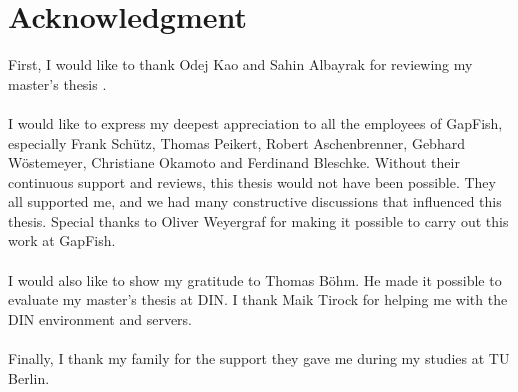 \section*{Acknowledgment}

First, I would like to thank Odej Kao and Sahin Albayrak for reviewing my master's
thesis .
\\\\
I would like to express my deepest appreciation to all the employees
of GapFish, especially Frank Schütz, Thomas Peikert, Robert
Aschenbrenner, Gebhard Wöstemeyer, Christiane Okamoto and Ferdinand
Bleschke. Without their continuous support and reviews, this thesis
would not have been possible. They all supported me, and we had many
constructive discussions that influenced this thesis. Special thanks
to Oliver Weyergraf for making it possible to carry out this work at
GapFish.
\\\\
I would also like to show my gratitude to Thomas Böhm. He made it
possible to evaluate my master's thesis at DIN. I thank Maik Tirock for
helping me with the DIN environment and servers.
\\\\
Finally, I thank my family for the support they gave me during
my studies at TU Berlin.
\clearpage
